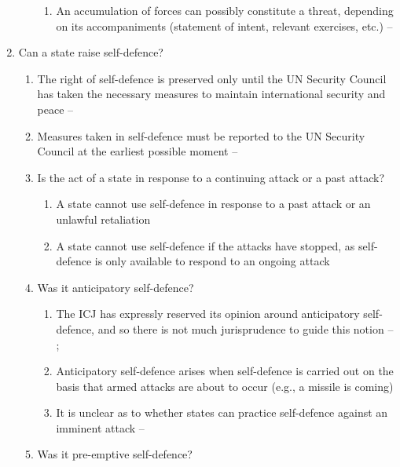 \begin{enumerate}
\begin{enumerate}
\begin{enumerate}
            \item An accumulation of forces can possibly constitute a threat, depending on its accompaniments (statement of intent, relevant exercises, etc.) -- 
        \end{enumerate}
    \end{enumerate}
    \item Can a state raise self-defence?
    \begin{enumerate}
        \item The right of self-defence is preserved only until the UN Security Council has taken the necessary measures to maintain international security and peace -- 
        \item Measures taken in self-defence must be reported to the UN Security Council at the earliest possible moment -- 
        \item Is the act of a state in response to a continuing attack or a past attack?
        \begin{enumerate}
            \item A state cannot use self-defence in response to a past attack or an unlawful retaliation
            \item A state cannot use self-defence if the attacks have stopped, as self-defence is only available to respond to an ongoing attack
        \end{enumerate}
        \item Was it anticipatory self-defence?
        \begin{enumerate}
            \item The ICJ has expressly reserved its opinion around anticipatory self-defence, and so there is not much jurisprudence to guide this notion -- ; 
            \item Anticipatory self-defence arises when self-defence is carried out on the basis that armed attacks are about to occur (e.g., a missile is coming)
            \item It is unclear as to whether states can practice self-defence against an imminent attack -- 
        \end{enumerate}
        \item Was it pre-emptive self-defence?
        \begin{enumerate}

\end{enumerate}
\end{enumerate}
\end{enumerate}
